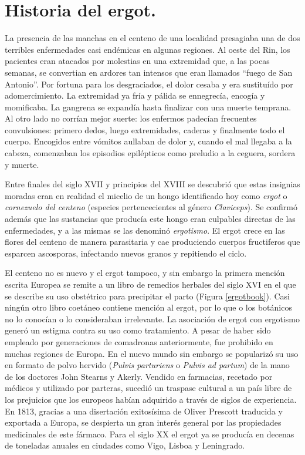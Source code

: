 \section{Historia del ergot.}

La presencia de las manchas en el centeno de una localidad presagiaba una de dos terribles enfermedades casi endémicas en algunas regiones. Al oeste del Rin, los pacientes eran atacados por molestias en una extremidad que, a las pocas semanas, se convertian en ardores tan intensos que eran llamados \enquote{fuego de San Antonio}. Por fortuna para los desgraciados, el dolor cesaba y era sustituído por adomercimiento. La extremidad ya fría y pálida se ennegrecía, encogía y momificaba. La gangrena se expandía hasta finalizar con una muerte temprana. Al otro lado no corrían mejor suerte: los enfermos padecían frecuentes convulsiones: primero dedos, luego extremidades, caderas y finalmente todo el cuerpo. Encogidos entre vómitos aullaban de dolor y, cuando el mal llegaba a la cabeza, comenzaban los episodios epilépticos como preludio a la ceguera, sordera y muerte.

Entre finales del siglo XVII y principios del XVIII se descubrió que estas insignias moradas eran en realidad el micelio de un hongo identificado hoy como \textit{ergot} o \textit{cornezuelo del centeno} (especies pertencecientes al género \textit{Claviceps}). Se confirmó además que las sustancias que producía este hongo eran culpables directas de las enfermedades, y a las mismas se las denominó \textit{ergotismo}. El ergot crece en las flores del centeno de manera parasitaria y cae produciendo cuerpos fructiferos que esparcen ascosporas, infectando nuevos granos y repitiendo el ciclo.

El centeno no es nuevo y el ergot tampoco, y sin embargo la primera mención escrita Europea se remite a un libro de remedios herbales del siglo XVI en el que se describe su uso obstétrico para precipitar el parto (Figura \ref{ergotbook}). Casi ningún otro libro coetáneo contiene mención al ergot, por lo que o los botánicos no lo conocían o lo consideraban irrelevante. La asociación de ergot con ergotismo generó un estigma contra su uso como tratamiento. A pesar de haber sido empleado por generaciones de comadronas anteriormente, fue prohibido en muchas regiones de Europa. En el nuevo mundo sin embargo se popularizó su uso en formato de polvo hervido (\textit{Pulvis parturiens} o \textit{Pulvis ad partum}) de la mano de los doctores John Stearns y Akerly. Vendido en farmacias, recetado por médicos y utilizado por parteras, sucedió un traspase cultural a un país libre de los prejuicios que los europeos habían adquirido a través de siglos de experiencia. En 1813, gracias a una disertación exitosísima de Oliver Prescott traducida y exportada a Europa, se despierta un gran interés general por las propiedades medicinales de este fármaco. Para el siglo XX el ergot ya se producía en decenas de toneladas anuales en ciudades como Vigo, Lisboa y Leningrado. 

